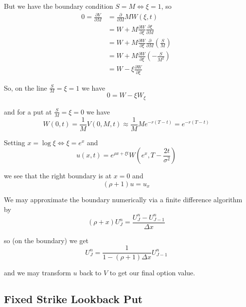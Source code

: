 \documentclass[12pt]{article}
\begin{document}
But we have the boundary condition $S = M \iff \xi = 1$, so
\begin{align*}
	0 = \frac{\partial V}{\partial M} &= \frac{\partial}{\partial M} MW(\xi, t) \\
	&= W + M\frac{\partial W}{\partial \xi}\frac{\partial \xi}{\partial M} \\
	&= W + M\frac{\partial W}{\partial \xi}\frac{\partial}{\partial M} \left( \frac{S}{M} \right) \\
	&= W + M\frac{\partial W}{\partial \xi} \left( - \frac{S}{M^2} \right) \\
	&= W - \xi\frac{\partial W}{\partial \xi}
\end{align*}

So, on the line $\frac{S}{M} = \xi = 1$ we have
\begin{equation*}
	0 = W - \xi W_\xi
\end{equation*}

and for a put at $\frac{S}{M} = \xi = 0$ we have
\begin{equation*}
	W(0, t) = \frac{1}{M} V(0, M, t) \approx \frac{1}{M}Me^{-r(T - t)} = e^{-r(T - t)}
\end{equation*}

Setting $x = \log \xi \iff \xi = e^x$ and 
\begin{equation*}
	u(x, t) = e^{\rho x + \xi t} W \left(e^x, T - \frac{2t}{\sigma^2} \right)
\end{equation*}

we see that the right boundary is at $x = 0$ and
\begin{equation*}
	(\rho + 1)u = u_x
\end{equation*}

We may approximate the boundary numerically via a finite difference algorithm by
\begin{equation*}
	(\rho + x) U^n_J = \frac{U^n_J - U^n_{J - 1}}{\Delta x}
\end{equation*}

so (on the boundary) we get
\begin{equation*}
	U^n_J = \frac{1}{1 - (\rho + 1)\Delta x} U^n_{J - 1}
\end{equation*}

and we may transform $u$ back to $V$ to get our final option value.

\subsection{Fixed Strike Lookback Put}
\end{document}
